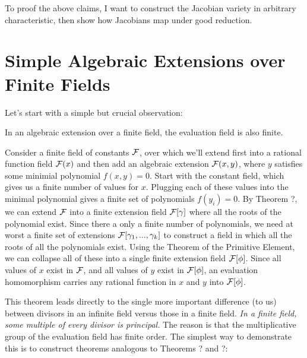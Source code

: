 To proof the above claims, I want to construct the Jacobian variety in
arbitrary characteristic, then show how Jacobians map under good
reduction.

\begin{comment}
x,y,z = PolynomialRing(QQ,3,'xyz').gens()
f = y^2*z^2 - (x^4+z^4)
X = Curve(f)
X.genus()

x,y,z = PolynomialRing(GF(5),3,'xyz').gens()
f = y^2*z^2 - (x^4+z^4)
X = Curve(f)
X.genus()
\end{comment}


\section{Simple Algebraic Extensions over Finite Fields}

Let's start with a simple but crucial observation:

\theorem

In an algebraic extension over a finite field, the evaluation field is
also finite.

\proof

Consider a finite field of constants ${\cal F}$, over which we'll
extend first into a rational function field ${\cal F}(x)$ and then add
an algebraic extension ${\cal F}(x,y)$, where $y$ satisfies some
minimial polynomial $f(x,y)=0$.  Start with the constant field, which
gives us a finite number of values for $x$.  Plugging each of these
values into the minimal polynomial gives a finite set of polynomials
$f(y_i)=0$.  By Theorem ?, we can extend ${\cal F}$ into a finite
extension field ${\cal F}[\gamma]$ where all the roots of the
polynomial exist.  Since there a only a finite number of polynomials,
we need at worst a finite set of extensions ${\cal
F}[\gamma_1,...,\gamma_k]$ to construct a field in which all the roots
of all the polynomials exist.  Using the Theorem of the Primitive
Element, we can collapse all of these into a single finite extension
field ${\cal F}[\phi]$.  Since all values of $x$ exist in ${\cal F}$,
and all values of $y$ exist in ${\cal F}[\phi]$, an evaluation
homomorphism carries any rational function in $x$ and $y$ into
${\cal F}[\phi]$.

\endtheorem

This theorem leads directly to the single more important difference
(to us) between divisors in an infinite field versus those in a finite
field.  {\it In a finite field, some multiple of every divisor is
principal.}  The reason is that the multiplicative group of the
evaluation field has finite order.  The simplest way to demonstrate
this is to construct theorems analogous to Theorems ? and ?:


